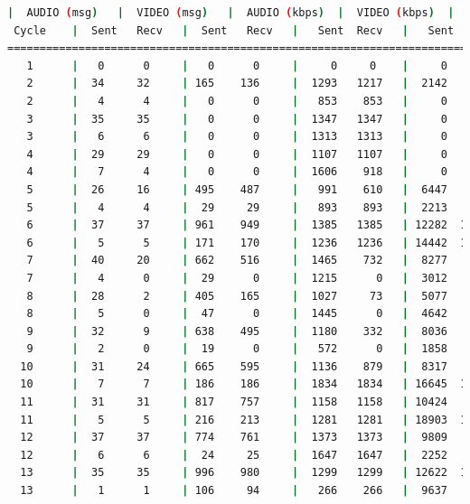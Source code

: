 \begin{lstlisting}[language=bash,basicstyle=\ttfamily\scriptsize]
          |  AUDIO (msg)   |  VIDEO (msg)   |  AUDIO (kbps)  |  VIDEO (kbps)  |   CPU (%)
 Cycle    |  Sent   Recv   |  Sent   Recv   |   Sent  Recv   |   Sent  Recv   | Program System
============================================================================================
   1      |   0      0     |   0      0     |     0     0    |     0     0    |   0      0
   2      |  34     32     | 165    136     |  1293   1217   |  2142   1767   |  30     65
   2      |   4      4     |   0      0     |   853    853   |     0      0   |  71     69
   3      |  35     35     |   0      0     |  1347   1347   |     0      0   |  59     76
   3      |   6      6     |   0      0     |  1313   1313   |     0      0   |  46     74
   4      |  29     29     |   0      0     |  1107   1107   |     0      0   |  36     74
   4      |   7      4     |   0      0     |  1606    918   |     0      0   |  35     75
   5      |  26     16     | 495    487     |   991    610   |  6447   6343   |  37     76
   5      |   4      4     |  29     29     |   893    893   |  2213   2213   |  13     74
   6      |  37     37     | 961    949     |  1385   1385   | 12282  12129   |  31     73
   6      |   5      5     | 171    170     |  1236   1236   | 14442  14358   |  37     76
   7      |  40     20     | 662    516     |  1465    732   |  8277   6449   |  36     74
   7      |   4      0     |  29      0     |  1215      0   |  3012      0   |  74     73
   8      |  28      2     | 405    165     |  1027     73   |  5077   2067   |  43     70
   8      |   5      0     |  47      0     |  1445      0   |  4642      0   |  61     69
   9      |  32      9     | 638    495     |  1180    332   |  8036   6235   |  29     68
   9      |   2      0     |  19      0     |   572      0   |  1858      0   |  34     68
  10      |  31     24     | 665    595     |  1136    879   |  8317   7445   |  23     72
  10      |   7      7     | 186    186     |  1834   1834   | 16645  16662   |  15     74
  11      |  31     31     | 817    757     |  1158   1158   | 10424   9658   |  21     73
  11      |   5      5     | 216    213     |  1281   1281   | 18903  18640   |  39     73
  12      |  37     37     | 774    761     |  1373   1373   |  9809   9644   |  28     71
  12      |   6      6     |  24     25     |  1647   1647   |  2252   2346   |  50     71
  13      |  35     35     | 996    980     |  1299   1299   | 12622  12424   |  27     76
  13      |   1      1     | 106     94     |   266    266   |  9637   8546   |  32     75

\end{lstlisting}
